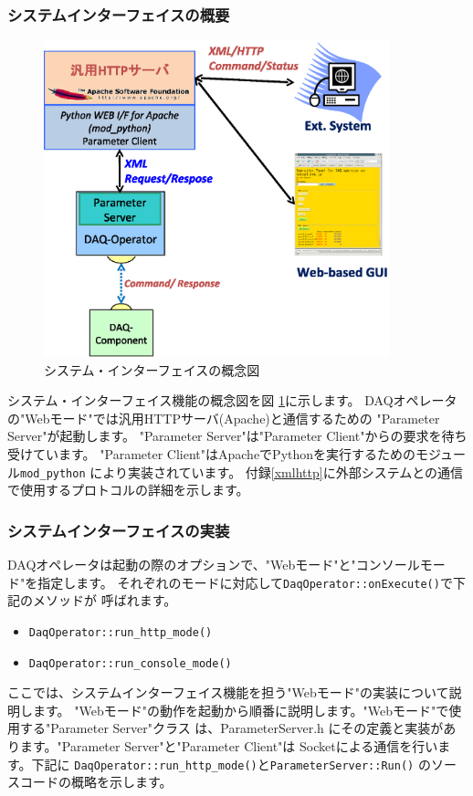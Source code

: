 \documentclass[a4j,10pt,dvips,onecolumn,oneside,final]{jarticle}%
\begin{document}
\subsubsection{システムインターフェイスの概要}\label{web-mode-overview}
\begin{figure}[htbp]
  \begin{center}
   \includegraphics[width=100mm]{web-interface.eps}
  \end{center}
  \caption{システム・インターフェイスの概念図}
  \label{web-interface.fig}
\end{figure}

システム・インターフェイス機能の概念図を図 \ref{web-interface.fig}に示します。
DAQオペレータの"Webモード"では汎用HTTPサーバ(Apache)と通信するための
"Parameter Server"が起動します。
"Parameter Server"は"Parameter Client"からの要求を待ち受けています。
"Parameter Client"はApacheでPythonを実行するためのモジュール\verb|mod_python|
により実装されています。
付録\ref{xmlhttp}に外部システムとの通信で使用するプロトコルの詳細を示します。

\subsubsection{システムインターフェイスの実装}\label{web-mode-tech}
DAQオペレータは起動の際のオプションで、"Webモード"と"コンソールモード"を指定します。
それぞれのモードに対応して\verb|DaqOperator::onExecute()|で下記のメソッドが
呼ばれます。
\begin{itemize}
\item \verb|DaqOperator::run_http_mode()|
\item \verb|DaqOperator::run_console_mode()|
\end{itemize}
ここでは、システムインターフェイス機能を担う"Webモード"の実装について説明します。
"Webモード"の動作を起動から順番に説明します。"Webモード"で使用する"Parameter Server"クラス
は、ParameterServer.h にその定義と実装があります。"Parameter Server"と"Parameter Client"は
Socketによる通信を行います。下記に \verb|DaqOperator::run_http_mode()|と\verb|ParameterServer::Run()|
のソースコードの概略を示します。
\end{document}
